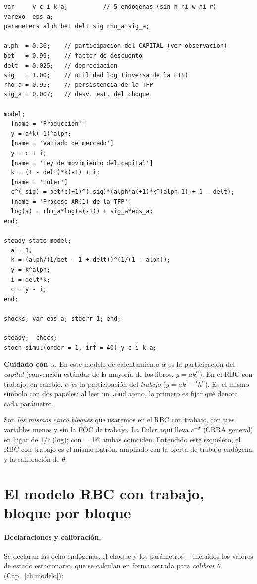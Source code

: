 \documentclass[11pt,a4paper]{report}
\newcounter{tcbrem}[section]
\renewcommand{\thetcbrem}{\thesection.\arabic{tcbrem}}
\newenvironment{remark}{%
  \refstepcounter{tcbrem}%
  \begin{tcolorbox}[remarkstyle, title={Observación~\thetcbrem}]}%
{\end{tcolorbox}}
\newcommand{\code}[1]{\texttt{#1}}
\begin{document}
\begin{lstlisting}
var     y c i k a;          // 5 endogenas (sin h ni w ni r)
varexo  eps_a;
parameters alph bet delt sig rho_a sig_a;

alph  = 0.36;    // participacion del CAPITAL (ver observacion)
bet   = 0.99;    // factor de descuento
delt  = 0.025;   // depreciacion
sig   = 1.00;    // utilidad log (inversa de la EIS)
rho_a = 0.95;    // persistencia de la TFP
sig_a = 0.007;   // desv. est. del choque

model;
  [name = 'Produccion']
  y = a*k(-1)^alph;
  [name = 'Vaciado de mercado']
  y = c + i;
  [name = 'Ley de movimiento del capital']
  k = (1 - delt)*k(-1) + i;
  [name = 'Euler']
  c^(-sig) = bet*c(+1)^(-sig)*(alph*a(+1)*k^(alph-1) + 1 - delt);
  [name = 'Proceso AR(1) de la TFP']
  log(a) = rho_a*log(a(-1)) + sig_a*eps_a;
end;

steady_state_model;
  a = 1;
  k = (alph/(1/bet - 1 + delt))^(1/(1 - alph));
  y = k^alph;
  i = delt*k;
  c = y - i;
end;

shocks; var eps_a; stderr 1; end;

steady;  check;
stoch_simul(order = 1, irf = 40) y c i k a;
\end{lstlisting}

\begin{remark}
\textbf{Cuidado con $\alpha$.} En este modelo de calentamiento $\alpha$ es la
participación del \emph{capital} (convención estándar de la mayoría de los libros,
$y=ak^\alpha$). En el RBC con trabajo, en cambio, $\alpha$ es la participación del
\emph{trabajo} ($y=ak^{1-\alpha}h^\alpha$). Es el mismo símbolo con dos papeles:
al leer un \code{.mod} ajeno, lo primero es fijar qué denota cada parámetro.
\end{remark}

\noindent Son \emph{los mismos cinco bloques} que usaremos en el RBC con trabajo,
con tres variables menos y sin la FOC de trabajo. La Euler aquí lleva $c^{-\sigma}$
(CRRA general) en lugar de $1/c$ (log); con \lstinline@sig = 1@ ambas coinciden.
Entendido este esqueleto, el RBC con trabajo es el mismo patrón, ampliado con la
oferta de trabajo endógena y la calibración de $\theta$.

\section{El modelo RBC con trabajo, bloque por bloque}
\label{sec:rbctrabajo}

\paragraph{Declaraciones y calibración.} Se declaran las ocho endógenas, el
choque y los parámetros ---incluidos los valores de estado estacionario, que se
calculan en forma cerrada para \emph{calibrar} $\theta$ (Cap.~\ref{ch:modelo}):
\end{document}
